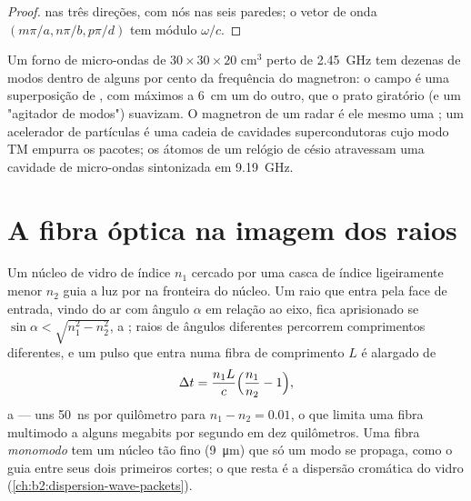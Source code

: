 \begin{proof}
 nas três direções, com nós nas seis paredes;
o vetor de onda $(m\pi/a, n\pi/b, p\pi/d)$ tem módulo $\omega/c$.
\end{proof}

\begin{example}\label{ex:b2:guided-waves:cavities}
Um forno de micro-ondas de $30 \times 30 \times 20$ cm$^3$ perto de \qty{2.45}{GHz} tem
dezenas de modos dentro de alguns por cento da frequência do magnetron:
o campo é uma superposição de , com máximos a
\qty{6}{cm} um do outro, que o prato giratório (e um "agitador de modos") suavizam.
O magnetron de um radar é ele mesmo uma ; um acelerador
de partículas é uma cadeia de cavidades supercondutoras cujo modo TM
empurra os pacotes; os átomos de um relógio de césio atravessam uma cavidade
de micro-ondas sintonizada em \qty{9.19}{GHz}.
\end{example}

\section{A fibra óptica na imagem dos raios}

\begin{proposition}\label{prop:b2:guided-waves:fibre}
Um núcleo de vidro de índice $n_1$ cercado por uma casca de índice ligeiramente
menor $n_2$ guia a luz por  na fronteira do
núcleo. Um raio que entra pela face de entrada, vindo do ar com ângulo $\alpha$ em relação
ao eixo, fica aprisionado se $\sin\alpha < \sqrt{n_1^2 - n_2^2}$, a \emph{}; raios de ângulos diferentes percorrem comprimentos diferentes, e um
pulso que entra numa fibra de comprimento $L$ é alargado de
\[
\Delta t = \frac{n_1L}c\Bigl(\frac{n_1}{n_2} - 1\Bigr) ,
\]
a \emph{} --- uns \qty{50}{ns} por quilômetro para $n_1
- n_2 = 0.01$, o que limita uma fibra multimodo a alguns megabits por
segundo em dez quilômetros. Uma fibra \emph{monomodo} tem um núcleo tão
fino (\qty{9}{\micro m}) que só um modo se propaga, como o guia
entre seus dois primeiros cortes; o que resta é a dispersão
cromática do vidro (\cref{ch:b2:dispersion-wave-packets}).
\end{proposition}

